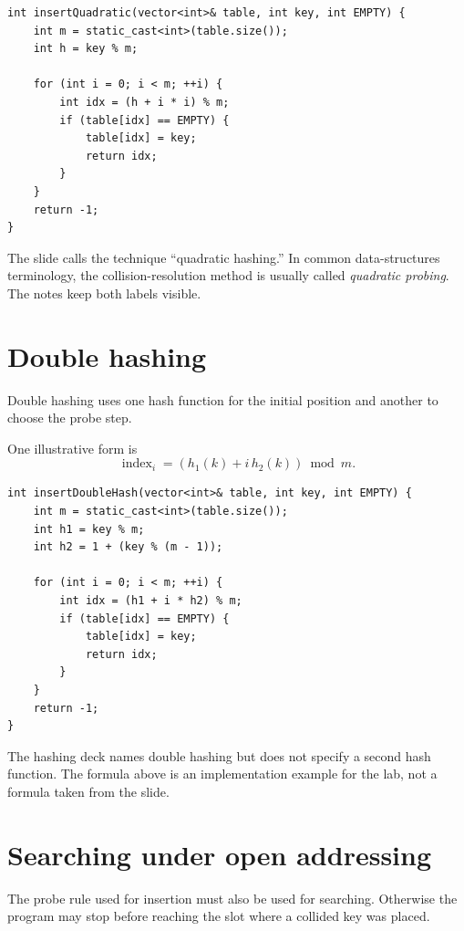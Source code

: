 \begin{lstlisting}
int insertQuadratic(vector<int>& table, int key, int EMPTY) {
    int m = static_cast<int>(table.size());
    int h = key % m;

    for (int i = 0; i < m; ++i) {
        int idx = (h + i * i) % m;
        if (table[idx] == EMPTY) {
            table[idx] = key;
            return idx;
        }
    }
    return -1;
}
\end{lstlisting}

\begin{clarification}
The slide calls the technique ``quadratic hashing.'' In common data-structures terminology, the collision-resolution method is usually called \emph{quadratic probing}. The notes keep both labels visible.
\end{clarification}

\section{Double hashing}

Double hashing uses one hash function for the initial position and another to choose the probe step.

One illustrative form is
\[
\operatorname{index}_i=(h_1(k)+i\,h_2(k))\bmod m.
\]

\begin{lstlisting}
int insertDoubleHash(vector<int>& table, int key, int EMPTY) {
    int m = static_cast<int>(table.size());
    int h1 = key % m;
    int h2 = 1 + (key % (m - 1));

    for (int i = 0; i < m; ++i) {
        int idx = (h1 + i * h2) % m;
        if (table[idx] == EMPTY) {
            table[idx] = key;
            return idx;
        }
    }
    return -1;
}
\end{lstlisting}

\begin{clarification}
The hashing deck names double hashing but does not specify a second hash function. The formula above is an implementation example for the lab, not a formula taken from the slide.
\end{clarification}

\section{Searching under open addressing}

The probe rule used for insertion must also be used for searching. Otherwise the program may stop before reaching the slot where a collided key was placed.

